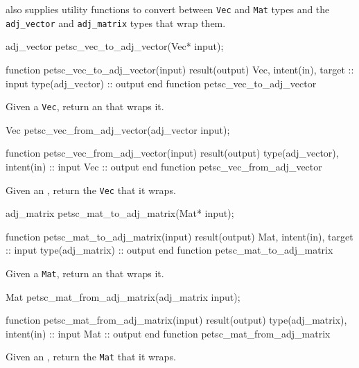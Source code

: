 \libadjoint also supplies utility functions to convert between \texttt{Vec} and \texttt{Mat}
types and the \texttt{adj_vector} and \texttt{adj_matrix} types that wrap them.
\begin{framed}
\begin{minipage}{\columnwidth}
\begin{ccode}
  adj_vector petsc_vec_to_adj_vector(Vec* input);
\end{ccode}
\begin{fortrancode}
  function petsc_vec_to_adj_vector(input) result(output)
    Vec, intent(in), target :: input
    type(adj_vector) :: output
  end function petsc_vec_to_adj_vector
\end{fortrancode}
\end{minipage}
\end{framed}
Given a \texttt{Vec}, return an  that wraps it.
\begin{framed}
\begin{minipage}{\columnwidth}
\begin{ccode}
  Vec petsc_vec_from_adj_vector(adj_vector input);
\end{ccode}
\begin{fortrancode}
  function petsc_vec_from_adj_vector(input) result(output)
    type(adj_vector), intent(in) :: input
    Vec :: output
  end function petsc_vec_from_adj_vector
\end{fortrancode}
\end{minipage}
\end{framed}
Given an , return the \texttt{Vec} that it wraps.
\begin{framed}
\begin{minipage}{\columnwidth}
\begin{ccode}
  adj_matrix petsc_mat_to_adj_matrix(Mat* input);
\end{ccode}
\begin{fortrancode}
  function petsc_mat_to_adj_matrix(input) result(output)
    Mat, intent(in), target :: input
    type(adj_matrix) :: output
  end function petsc_mat_to_adj_matrix
\end{fortrancode}
\end{minipage}
\end{framed}
Given a \texttt{Mat}, return an  that wraps it.
\begin{framed}
\begin{minipage}{\columnwidth}
\begin{ccode}
  Mat petsc_mat_from_adj_matrix(adj_matrix input);
\end{ccode}
\begin{fortrancode}
  function petsc_mat_from_adj_matrix(input) result(output)
    type(adj_matrix), intent(in) :: input
    Mat :: output
  end function petsc_mat_from_adj_matrix
\end{fortrancode}
\end{minipage}
\end{framed}
Given an , return the \texttt{Mat} that it wraps.

